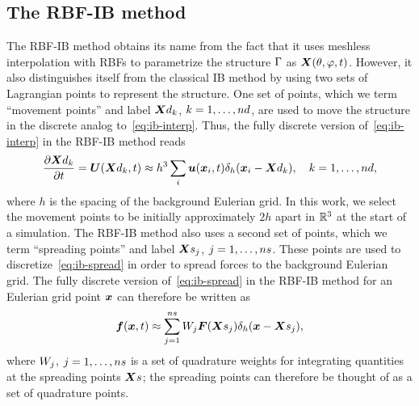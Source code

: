 \subsection{The RBF-IB method}\label{sec:rbfib}

The RBF-IB method obtains its name from the fact that it uses meshless interpolation with RBFs to parametrize the
structure $\Gamma$ as $\boldsymbol{X}(\theta, \varphi, t)$. However, it also distinguishes itself from the classical IB
method by using two sets of Lagrangian points to represent the structure. One set of points, which we term
``movement points'' and label $\data\X_k$, $k=1, \ldots, \data\cardinality$, are used to move the structure in the
discrete analog to~\eqref{eq:ib-interp}. Thus, the fully discrete version of~\eqref{eq:ib-interp} in the RBF-IB
method reads
\begin{equation}\label{eq:ib-interp-disc}
    \frac{\partial\data\X_k}{\partial t} = \U(\data\X_k, t) \approx h^3 \sum_i \u(\x_i, t) \Dirac_h(\x_i-\data\X_k), \quad k=1, \ldots, \data\cardinality,
\end{equation}
where $h$ is the spacing of the background Eulerian grid. %
In this work, we select the
movement points to be initially approximately $2h$ apart in $\mathbb{R}^3$ at the start of a simulation. The RBF-IB method
also uses a second set of points, which we term ``spreading points'' and label $\Xsj$,
$j=1, \ldots, \sample\cardinality$. These points are used to discretize~\eqref{eq:ib-spread} in order to spread
forces to the background Eulerian grid. The fully discrete version of~\eqref{eq:ib-spread} in the RBF-IB method
for an Eulerian grid point $\boldsymbol{x}$ can therefore be written as
\begin{align}\label{eq:ib-spread-disc}
        \f(\x, t) \approx\sum\limits_{j=1}^{\sample\cardinality} \weight[j]\F(\Xsj) \Dirac_h(\x-\Xsj),
\end{align}
where $\weight[j]$, $j=1, \ldots, \sample\cardinality$ is a set of quadrature weights for integrating quantities
at the spreading points $\sample\X$; the spreading points can therefore be thought of as a set of quadrature
points.%

